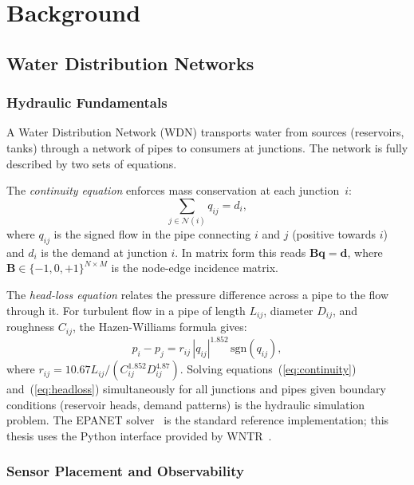 \chapter{Background}
\label{ch:background}

\section{Water Distribution Networks}
\label{sec:wdn_background}

\subsection{Hydraulic Fundamentals}

A Water Distribution Network (WDN) transports water from sources (reservoirs, tanks)
through a network of pipes to consumers at junctions. The network is
fully described by two sets of equations.

The \emph{continuity equation} enforces mass conservation at each
junction~$i$:
\begin{equation}
  \sum_{j \in \mathcal{N}(i)} q_{ij} = d_i,
  \label{eq:continuity}
\end{equation}
where $q_{ij}$ is the signed flow in the pipe connecting $i$ and $j$
(positive towards $i$) and $d_i$ is the demand at junction $i$. In
matrix form this reads $\mathbf{B}\mathbf{q} = \mathbf{d}$, where
$\mathbf{B} \in \{-1, 0, +1\}^{N \times M}$ is the node-edge
incidence matrix.

The \emph{head-loss equation} relates the pressure difference across
a pipe to the flow through it. For turbulent flow in a pipe of length
$L_{ij}$, diameter $D_{ij}$, and roughness $C_{ij}$, the
Hazen-Williams formula gives:
\begin{equation}
  p_i - p_j = r_{ij} \, |q_{ij}|^{1.852} \, \mathrm{sgn}(q_{ij}),
  \label{eq:headloss}
\end{equation}
where $r_{ij} = 10.67 L_{ij} / (C_{ij}^{1.852} D_{ij}^{4.87})$.
Solving equations~(\ref{eq:continuity}) and~(\ref{eq:headloss})
simultaneously for all junctions and pipes given boundary conditions
(reservoir heads, demand patterns) is the hydraulic simulation
problem. The EPANET solver~\cite{rossman2000epanet} is the
standard reference implementation; this thesis uses the Python
interface provided by WNTR~\cite{klise2017wntr}.

\subsection{Sensor Placement and Observability}

